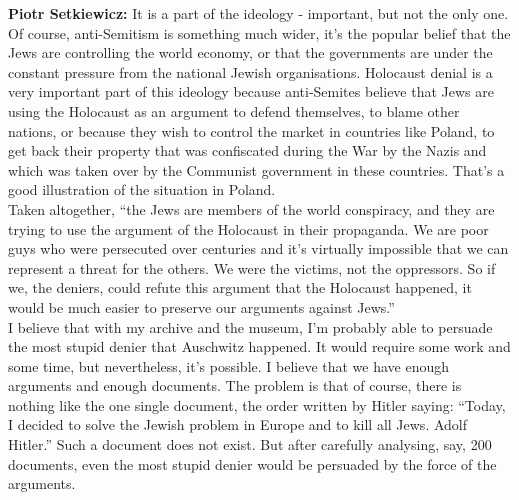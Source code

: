 \textbf{Piotr Setkiewicz:} It is a part of the ideology - important, but not the only one. Of course, anti-Semitism is something much wider, it’s the popular belief that the Jews are controlling the world economy, or that the governments are under the constant pressure from the national Jewish organisations. Holocaust denial is a very important part of this ideology because anti-Semites believe that Jews are using the Holocaust as an argument to defend themselves, to blame other nations, or because they wish to control the market in countries like Poland, to get back their property that was confiscated during the War by the Nazis and which was taken over by the Communist government in these countries. That’s a good illustration of the situation in Poland.\\ Taken altogether, ``the Jews are members of the world conspiracy, and they are trying to use the argument of the Holocaust in their propaganda. We are poor guys who were persecuted over centuries and it’s virtually impossible that we can represent a threat for the others. We were the victims, not the oppressors. So if we, the deniers, could refute this argument that the Holocaust happened, it would be much easier to preserve our arguments against Jews.'' \\
I believe that with my archive and the museum, I’m probably able to persuade the most stupid denier that Auschwitz happened. It would require some work and some time, but nevertheless, it’s possible. I believe that we have enough arguments and enough documents. The problem is that of course, there is nothing like the one single document, the order written by Hitler saying: ``Today, I decided to solve the Jewish problem in Europe and to kill all Jews. Adolf Hitler.'' Such a document does not exist. But after carefully analysing, say, 200 documents, even the most stupid denier would be persuaded by the force of the arguments.